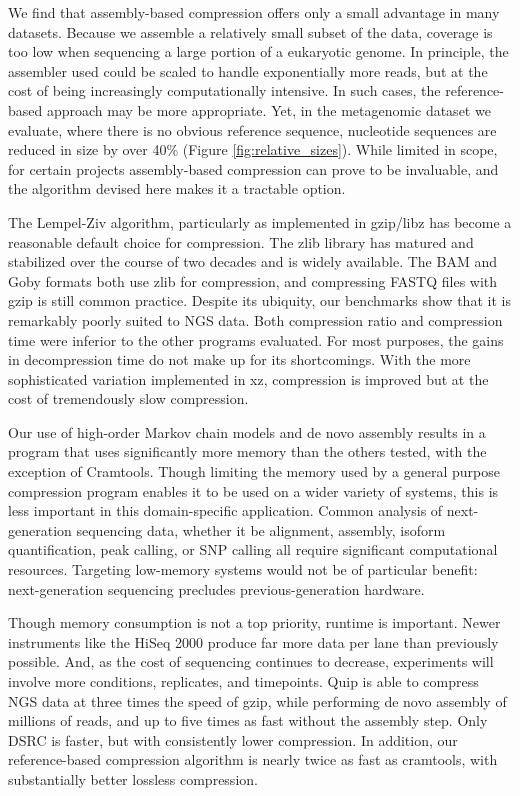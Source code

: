 \documentclass[a4,center,fleqn]{NAR}
\begin{document}
We find that assembly-based compression offers only a small advantage in many
datasets. Because we assemble a relatively small subset of the data, coverage
is too low when sequencing a large portion of a eukaryotic genome. In
principle, the assembler used could be scaled to handle exponentially more
reads, but at the cost of being increasingly computationally intensive. In
such cases, the reference-based approach may be more appropriate. Yet, in the
metagenomic dataset we evaluate, where there is no obvious reference sequence,
nucleotide sequences are reduced in size by over 40\% (Figure
\ref{fig:relative_sizes}). While limited in scope, for certain projects
assembly-based compression can prove to be invaluable, and the algorithm devised
here makes it a tractable option.

The Lempel-Ziv algorithm, particularly as implemented in gzip/libz has become
a reasonable default choice for compression. The zlib library has matured and
stabilized over the course of two decades and is widely available. The BAM and
Goby formats both use zlib for compression, and compressing FASTQ files with
gzip is still common practice. Despite its ubiquity, our benchmarks show that
it is remarkably poorly suited to NGS data. Both compression ratio and
compression time were inferior to the other programs evaluated. For most
purposes, the gains in decompression time do not make up for its shortcomings.
With the more sophisticated variation implemented in xz, compression is improved
but at the cost of tremendously slow compression.

Our use of high-order Markov chain models and de novo assembly results in a
program that uses significantly more memory than the others tested, with the
exception of Cramtools. Though limiting the memory used by a general purpose
compression program enables it to be used on a wider variety of systems, this
is less important in this domain-specific application. Common analysis of
next-generation sequencing data, whether it be alignment, assembly, isoform
quantification, peak calling, or SNP calling all require significant
computational resources. Targeting low-memory systems would not be of
particular benefit: next-generation sequencing precludes previous-generation
hardware.

Though memory consumption is not a top priority, runtime is important. Newer
instruments like the HiSeq 2000 produce far more data per lane than previously
possible. And, as the cost of sequencing continues to decrease, experiments
will involve more conditions, replicates, and timepoints.  Quip is able to
compress NGS data at three times the speed of gzip, while performing de novo
assembly of millions of reads, and up to five times as fast without the
assembly step. Only DSRC is faster, but with consistently lower compression.
In addition, our reference-based compression algorithm is nearly twice as fast
as cramtools, with substantially better lossless compression.
\end{document}
